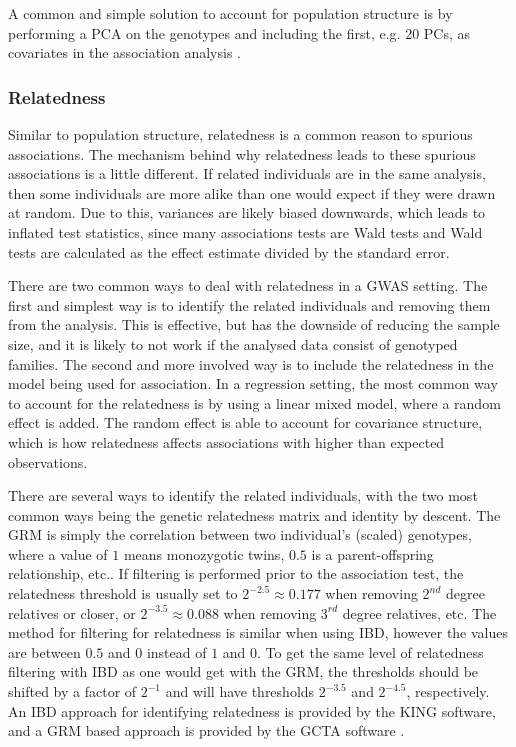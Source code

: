 A common and simple solution to account for population structure is by performing a PCA on the genotypes and including the first, e.g. 20 PCs, as covariates in the association analysis \cite{price2006principal,price2010new}.

\subsubsection{Relatedness}
Similar to population structure, relatedness is a common reason to spurious associations. The mechanism behind why relatedness leads to these spurious associations is a little different. If related individuals are in the same analysis, then some individuals are more alike than one would expect if they were drawn at random. Due to this, variances are likely biased downwards, which leads to inflated test statistics, since many associations tests are Wald tests and Wald tests are calculated as the effect estimate divided by the standard error. 

There are two common ways to deal with relatedness in a GWAS setting. The first and simplest way is to identify the related individuals and removing them from the analysis. This is effective, but has the downside of reducing the sample size, and it is likely to not work if the analysed data consist of genotyped families. The second and more involved way is to include the relatedness in the model being used for association. In a regression setting, the most common way to account for the relatedness is by using a linear mixed model, where a random effect is added. The random effect is able to account for covariance structure, which is how relatedness affects associations with higher than expected observations.\cite{yu2006unified, kang2008efficient}

There are several ways to identify the related individuals, with the two most common ways being the genetic relatedness matrix and identity by descent. The GRM is simply the correlation between two individual's (scaled) genotypes, where a value of $ 1 $ means monozygotic twins, $ 0.5 $ is a parent-offspring relationship, etc.. If filtering is performed prior to the association test, the relatedness threshold is usually set to $ 2^{-2.5} \approx 0.177 $ when removing $ 2^{nd} $ degree relatives or closer, or $ 2^{-3.5} \approx 0.088 $ when removing $ 3^{rd} $ degree relatives, etc. The method for filtering for relatedness is similar when using IBD, however the values are between $ 0.5 $ and $ 0 $ instead of $ 1 $ and $ 0 $. To get the same level of relatedness filtering with IBD as one would get with the GRM, the thresholds should be shifted by a factor of $ 2^{-1} $ and will have thresholds $ 2^{-3.5} $ and $ 2^{-4.5} $, respectively. An IBD approach for identifying relatedness is provided by the KING software\cite{manichaikul2010robust}, and a GRM based approach is provided by the GCTA software \cite{yang2011gcta}.


